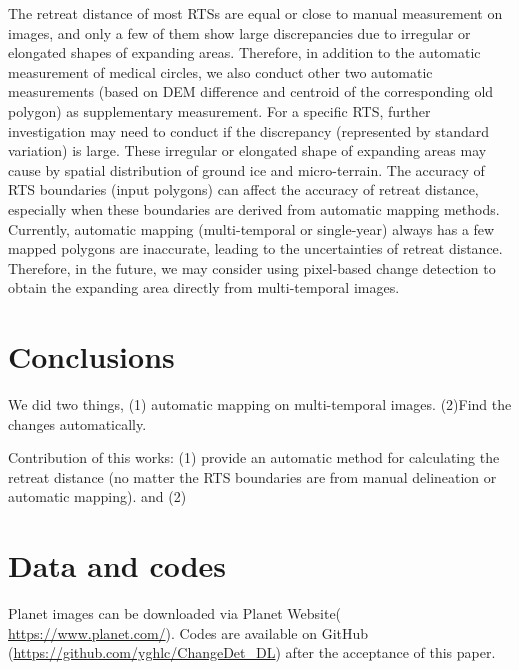 \documentclass[authoryear,preprint,review,12pt]{elsarticle}
\begin{document}
The retreat distance of most RTSs are equal or close to manual measurement on images, and only a few of them show large discrepancies due to irregular or elongated shapes of expanding areas. 
Therefore, in addition to the automatic measurement of medical circles, we also conduct other two automatic measurements (based on DEM difference and centroid of the corresponding old polygon) as supplementary measurement. 
For a specific RTS, further investigation may need to conduct if the discrepancy (represented by standard variation) is large. 
These irregular or elongated shape of expanding areas may cause by spatial distribution of ground ice and micro-terrain.
The accuracy of RTS boundaries (input polygons) can affect the accuracy of retreat distance, especially when these boundaries are derived from automatic mapping methods. 
Currently, automatic mapping (multi-temporal or single-year) always has a few mapped polygons are inaccurate, leading to the uncertainties of retreat distance. 
Therefore, in the future, we may consider using pixel-based change detection to obtain the expanding area directly from multi-temporal images. 



%


\section{Conclusions}
\label{sec_conclusion}

We did two things, (1) automatic mapping on multi-temporal images. 
(2)Find the changes automatically. 

 Contribution of this works: (1) provide an automatic method for calculating the retreat distance (no matter the RTS boundaries are from manual delineation or automatic mapping).
  and (2) 

\section{Data and codes}
\label{sec_data_codes}

Planet images can be downloaded via Planet Website( \url{https://www.planet.com/}). 
Codes are available on GitHub (\url{https://github.com/yghlc/ChangeDet_DL}) after the acceptance of this paper.
\end{document}
